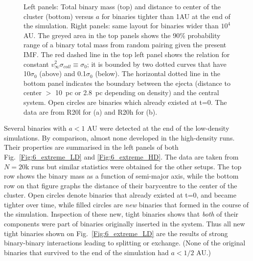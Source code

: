 \begin{figure}
\begin{center}
\begin{subfigure}[b]{0.9\textwidth}
    \end{subfigure}
\caption[Extreme tight and wide binaries]{Left panels: Total binary mass (top) and distance to center of the cluster (bottom) versus $a$ for binaries tighter than 1AU at the end of the simulation. Right panels: same layout for binaries wider than $10^4$AU. The greyed area in the top panels shows the 90\% probability range of a binary total mass from random pairing given the present IMF. The  red dashed line in the top left panel shows the relation for  constant $v^2_\infty \sigma_{coll} \equiv \sigma_0$; it is bounded by two dotted curves that have 10$\sigma_0$ (above) and 0.1$\sigma_0$ (below). The horizontal dotted line in the bottom panel indicates the boundary between the ejecta (distance to center $>$ 10~pc or 2.8~pc depending on density) and the central system. Open circles are binaries which already existed at t=0. The data are from R20l for (a) and R20h for (b).}
\label{Fig:6_extreme}
\end{center}
\end{figure}


Several binaries with $a < 1 $ AU were detected at the end of the low-density simulations. By comparison, almost none developed in the high-density runs. Their properties are summarised in the left panels of both Fig.~\ref{Fig:6_extreme_LD} and \ref{Fig:6_extreme_HD}. 
The data are taken from $N = 20$k runs but similar statistics were obtained for the other setups. 
The top row shows the binary mass as a function of semi-major axis, while the  bottom row on that figure  graphs the distance of their barycentre to the center of the cluster. Open circles denote binaries that already existed at t=0, and became tighter over time, while filled circles are {\it new} binaries that formed in the course of the simulation. Inspection of these new, tight  binaries shows that {\it both} of their components were part of  binaries originally inserted in the system. Thus all new tight binaries shown on Fig.~\ref{Fig:6_extreme_LD}  are the results of strong binary-binary interactions leading to splitting or exchange. (None of the original  binaries that survived 	to the end of the simulation had  $a < 1/2 $ AU.)
	
 
